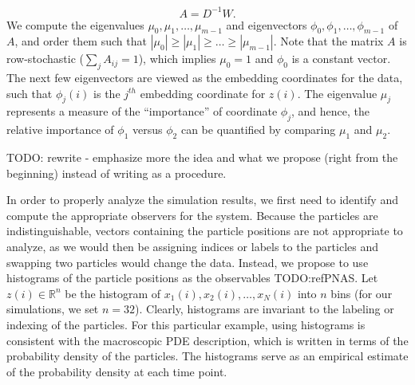\documentclass[prl, reprint, final, showkeys]{revtex4-1}
\begin{document}
\begin{equation}
A = D^{-1} W.
\end{equation}
%
We compute the eigenvalues $\mu_0, \mu_1, \dots, \mu_{m-1}$ and eigenvectors $\phi_0, \phi_1, \dots, \phi_{m-1}$ of $A$, and order them such that $|\mu_0| \ge |\mu_1| \ge \dots \ge |\mu_{m-1}|$. 
%
Note that the matrix $A$ is row-stochastic ($\sum_j A_{ij} = 1$), which implies $\mu_0 = 1$ and $\phi_0$ is a constant vector.
%
The next few eigenvectors are viewed as the embedding coordinates for the data, such that
$\phi_{j}(i)$ is the $j^{th}$ embedding coordinate for $z(i)$.
%
The eigenvalue $\mu_j$ represents a measure of the ``importance'' of coordinate $\phi_j$,
and hence, the relative importance of $\phi_1$ versus $\phi_2$ can be quantified by comparing $\mu_1$ and $\mu_2$.

TODO: rewrite - emphasize more the idea and what we propose (right from the beginning) instead of writing as a procedure.

In order to properly analyze the simulation results, we first need to identify and compute the appropriate observers for the system.
%
Because the particles are indistinguishable, vectors containing the particle positions are not appropriate to analyze, as we would then be assigning indices or labels to the particles and swapping two particles would change the data.
%
Instead, we propose to use histograms of the particle positions as the observables TODO:refPNAS. Let $z(i) \in \mathbb{R}^n$ be the histogram of $x_1(i), x_2(i), \dots, x_N(i)$ into $n$ bins (for our simulations, we set $n=32$).
%
Clearly, histograms are invariant to the labeling or indexing of the particles.
%
For this particular example, using histograms is consistent with the macroscopic PDE description, which is written in terms of the probability density of the particles.
%
The histograms serve as an empirical estimate of the probability density at each time point.

\end{document}

